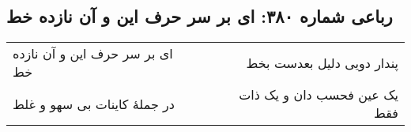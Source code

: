 \begin{center}
\section*{رباعی شماره ۳۸۰: ای بر سر حرف این و آن نازده خط}
\label{sec:sh380}
\begin{longtable}{l p{0.5cm} r}
ای بر سر حرف این و آن نازده خط
&&
پندار دویی دلیل بعدست بخط
\\
در جملهٔ کاینات بی سهو و غلط
&&
یک عین فحسب دان و یک ذات فقط
\\
\end{longtable}
\end{center}
